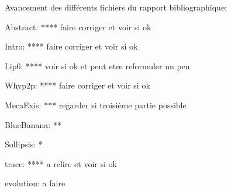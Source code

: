 Avancement des différents fichiers du rapport bibliographique:

Abstract: **** faire corriger et voir si ok 

Intro: **** faire corriger et voir si ok

Lip6: **** voir si ok et peut etre reformuler un peu
 
Whyp2p: **** faire corriger et voir si ok

MecaExis: *** regarder si troisième partie possible

BlueBanana: **

Sollipsis: *

trace: **** a relire et voir si ok

evolution: a faire
